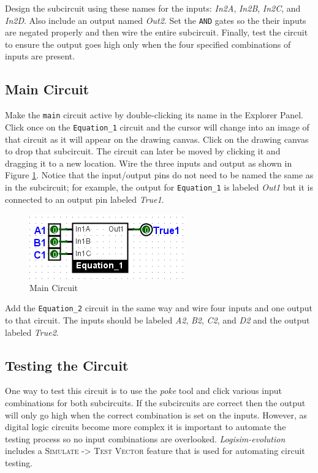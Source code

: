 Design the subcircuit using these names for the inputs: \textit{In2A}, \textit{In2B}, \textit{In2C}, and \textit{In2D}. Also include an output named \textit{Out2}. Set the \texttt{AND} gates so the their inputs are negated properly and then wire the entire subcircuit. Finally, test the circuit to ensure the output goes high only when the four specified combinations of inputs are present.

\subsection{Main Circuit}

Make the \lstinline[columns=fixed]|main| circuit active by double-clicking its name in the Explorer Panel. Click once on the \lstinline[columns=fixed]|Equation_1| circuit and the cursor will change into an image of that circuit as it will appear on the drawing canvas. Click on the drawing canvas to drop that subcircuit. The circuit can later be moved by clicking it and dragging it to a new location. Wire the three inputs and output as shown in Figure \ref{fig:02-05}. Notice that the input/output pins do not need to be named the same as in the subcircuit; for example, the output for \lstinline[columns=fixed]|Equation_1| is labeled \textit{Out1} but it is connected to an output pin labeled \textit{True1}.

\begin{figure}[H]
	\centering
	\includegraphics[width=\maxwidth{.95\linewidth}]{gfx/02-05}
	\caption{Main Circuit}
	\label{fig:02-05}
\end{figure}

Add the \lstinline[columns=fixed]|Equation_2| circuit in the same way and wire four inputs and one output to that circuit. The inputs should be labeled \textit{A2}, \textit{B2}, \textit{C2}, and \textit{D2} and the output labeled \textit{True2}.

\subsection{Testing the Circuit}

One way to test this circuit is to use the \textit{poke} tool and click various input combinations for both subcircuits. If the subcircuits are correct then the output will only go high when the correct combination is set on the inputs. However, as digital logic circuits become more complex it is important to automate the testing process so no input combinations are overlooked. \textit{Logisim-evolution} includes a \textsc{Simulate -> Test Vector} feature that is used for automating circuit testing.

